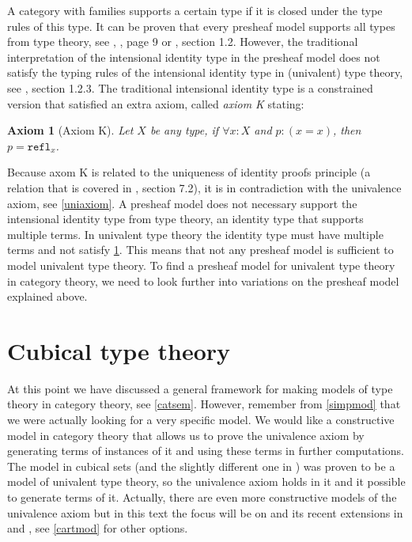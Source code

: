 \documentclass[12pt,a4paper,twoside,xetex,draft]{book}
\newcommand{\keyword}[1]{\emph{#1}\index{#1}}
\newtheorem{axiom}[theorem]{Axiom}
\newcommand{\op}[1]{\mathtt{#1}}
\begin{document}
A category with families supports a certain type if it is closed under the type rules of this type.  It can be proven that every presheaf model supports all types from type theory, see \cite{Hofmann1997}, \cite{Nuyts2018}, page 9 or \cite{Huber2016}, section 1.2. However, the traditional interpretation of the intensional identity type in the presheaf model does not satisfy the typing rules of the intensional identity type in (univalent) type theory, see \cite{Huber2016}, section 1.2.3. The traditional intensional identity type is a constrained version that satisfied an extra axiom, called \keyword{axiom K} stating: 

\begin{axiom}[Axiom K]\label{axiomk}
Let $X$ be any type, if $\forall x : X$ and $p : (x = x)$, then $p = \op{refl}_x$.  
\end{axiom}

Because axom K is related to the uniqueness of identity proofs principle (a relation that is covered in \cite{Voevodsky2013}, section 7.2), it is in contradiction with the univalence axiom, see \cref{uniaxiom}. A presheaf model does not necessary support the intensional identity type from type theory, an identity type that supports multiple terms. In univalent type theory the identity type must have multiple terms and not satisfy \cref{axiomk}. This means that not any presheaf model is sufficient to model univalent type theory. To find a presheaf model for univalent type theory in category theory, we need to look further into variations on the presheaf model explained above.  

\chapter{Cubical type theory}\label{cubical}

At this point we have discussed a general framework for making models of type theory in category theory, see \cref{catsem}. However, remember from \cref{simpmod} that we were actually looking for a very specific model. We would like a constructive model in category theory that allows us to prove the univalence axiom by generating terms of instances of it and using these terms in further computations. The model in cubical sets \cite{Bezem2014} (and the slightly different one in \cite{Cohen2016}) was proven to be a model of univalent type theory, so the univalence axiom holds in it and it possible to generate terms of it. Actually, there are even more constructive models of the univalence axiom but in this text the focus will be on \cite{Cohen2016} and its recent extensions in \cite{Coquand2018} and \cite{Moertberg2018}, see \cref{cartmod} for other options. 
\end{document}
